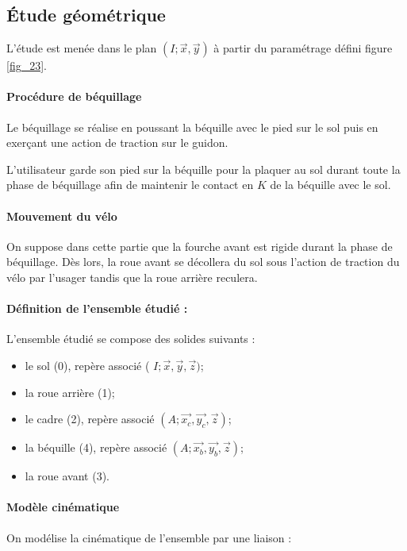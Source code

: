 \subsection{Étude géométrique}
\ifprof
\else

L'étude est menée dans le plan \((I ; \vec{x}, \vec{y})\) à partir du paramétrage défini figure \ref{fig_23}.

\paragraph*{Procédure de béquillage} Le béquillage se réalise en poussant la béquille avec le pied sur le sol puis en exerçant une action de traction sur le guidon.

L'utilisateur garde son pied sur la béquille pour la plaquer au sol durant toute la phase de béquillage afin de maintenir le contact en \(K\) de la béquille avec le sol.

\paragraph*{Mouvement du vélo} On suppose dans cette partie que la fourche avant est rigide durant la phase de béquillage. Dès lors, la roue avant se décollera du sol sous l'action de traction du vélo par l'usager tandis que la roue arrière reculera.

\paragraph*{Définition de l'ensemble étudié :} L'ensemble étudié se compose des solides suivants :
\begin{itemize}
  \item le sol (0), repère associé ( \(I ; \vec{x}, \vec{y}, \vec{z})\);
  \item la roue arrière (1);
  \item le cadre (2), repère associé \(\left(A ; \overrightarrow{x_{c}}, \overrightarrow{y_{c}}, \vec{z}\right)\);
  \item la béquille (4), repère associé \(\left(A ; \overrightarrow{x_{b}}, \overrightarrow{y_{b}}, \vec{z}\right)\);
  \item la roue avant (3).
\end{itemize}


\paragraph*{Modèle cinématique} On modélise la cinématique de l'ensemble par une liaison :

